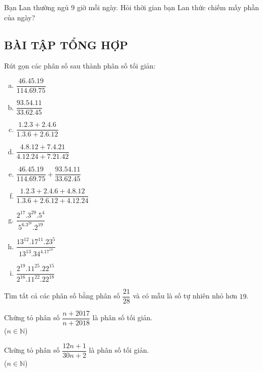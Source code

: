 \begin{bt}
Bạn Lan thường ngủ 9 giờ mỗi ngày. Hỏi thời gian bạn Lan thức chiếm mấy phần của ngày?
\subsection{BÀI TẬP TỔNG HỢP}
\end{bt}   \begin{bt}

Rút gọn các phân số sau thành phân số tối giản:
\begin{multicols}{2}
\begin{enumerate}[a)]
\item $\dfrac{46.45.19}{114.69.75}$
\item $\dfrac{93.54.11}{33.62.45}$
\item $\dfrac{1.2.3 + 2.4.6}{1.3.6 + 2.6.12}$
\item $\dfrac{4.8.12 + 7.4.21}{4.12.24 + 7.21.42}$
\item $\dfrac{46.45.19}{114.69.75} + \dfrac{93.54.11}{33.62.45} $
\item $\dfrac{1.2.3 + 2.4.6 + 4.8.12}{1.3.6 + 2.6.12 + 4.12.24}$
\item $\dfrac{2^{17}.3^{29}.5^4}{5^6.3^{28}.2^{19}}$
\item $\dfrac{13^{12}.17^{11}.23^5}{13^{13}.34^4.17^{10}}$
\item $\dfrac{2^{19}.11^{25}.22^{15}}{2^{16}.11^{22}.22^{18}}$
\end{enumerate}
\end{multicols}

\end{bt}   \begin{bt}

Tìm tất cả các phân số bằng phân số $\dfrac{21}{28}$ và có mẫu là số tự nhiên nhỏ hơn $19$.


\end{bt}   \begin{bt}

Chứng tỏ phân số $\dfrac{n+2017}{n+2018}$ là phân số tối giản. \\($n \in \mathbb{N}$)

\end{bt}   \begin{bt}
 
Chứng tỏ phân số $\dfrac{12n +1}{30n+2}$ là phân số tối giản. \\($n \in \mathbb{N}$)


\end{bt}
